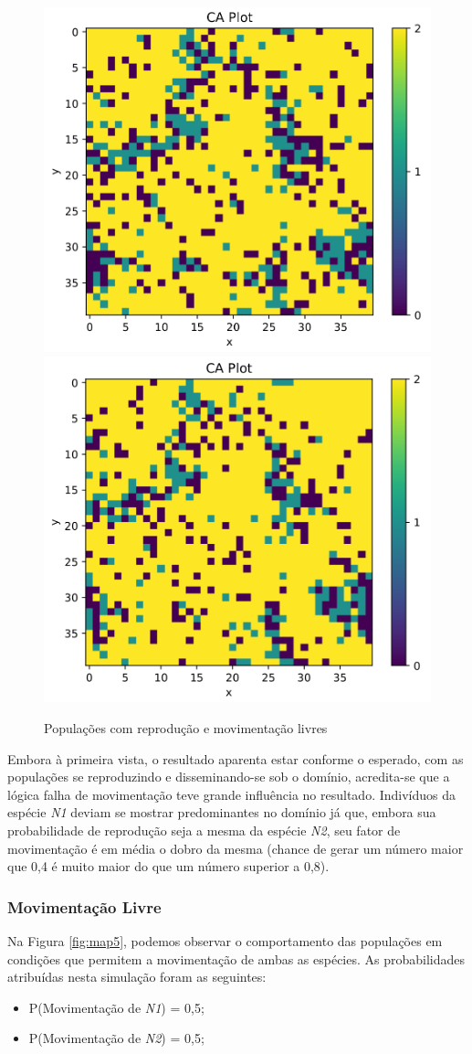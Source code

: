 \documentclass[a4paper, 12pt]{article}
\begin{document}
\begin{figure}[H]
    \includegraphics[width=.49\textwidth]{Images/Exercise 7/all/9.png}
    \includegraphics[width=.49\textwidth]{Images/Exercise 7/all/10.png}
    \caption{Populações com reprodução e movimentação livres}
    \label{fig:map3}
\end{figure}

\pagebreak

Embora à primeira vista, o resultado aparenta estar conforme o esperado, com as populações se reproduzindo e disseminando-se sob o domínio, acredita-se que a lógica falha de movimentação teve grande influência no resultado. Indivíduos da espécie \emph{N1} deviam se mostrar predominantes no domínio já que, embora sua probabilidade de reprodução seja a mesma da espécie \emph{N2}, seu fator de movimentação é em média o dobro da mesma (chance de gerar um número maior que 0,4 é muito maior do que um número superior a 0,8).

\subsubsection*{Movimentação Livre}

Na Figura \ref{fig:map5}, podemos observar o comportamento das populações em condições que permitem a movimentação de ambas as espécies. As probabilidades atribuídas nesta simulação foram as seguintes:

\begin{itemize}
    \item P(Movimentação de \emph{N1}) = 0,5;
    \item P(Movimentação de \emph{N2}) = 0,5;
\end{itemize}
\end{document}
